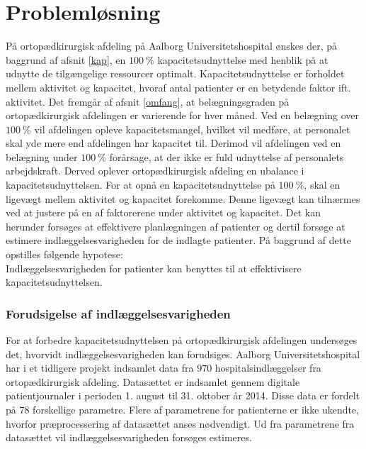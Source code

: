 \chapter{Problemløsning}
På ortopædkirurgisk afdeling på Aalborg Universitetshospital ønskes der, på baggrund af afsnit \ref{kap}, en $100~\%$ kapacitetsudnyttelse med henblik på at udnytte de tilgængelige ressourcer optimalt. Kapacitetsudnyttelse er forholdet mellem aktivitet og kapacitet, hvoraf antal patienter er en betydende faktor ift. aktivitet. 
Det fremgår af afsnit \ref{omfang}, at belægningsgraden på ortopædkirurgisk afdelingen er varierende for hver måned. Ved en belægning over $100~\%$ vil afdelingen opleve kapacitetsmangel, hvilket vil medføre, at personalet skal yde mere end afdelingen har kapacitet til. Derimod vil afdelingen ved en belægning under $100~\%$ forårsage, at der ikke er fuld udnyttelse af personalets arbejdskraft. Derved oplever ortopædkirurgisk afdeling en ubalance i kapacitetsudnyttelsen. 
For at opnå en kapacitetsudnyttelse på $100~\%$, skal en ligevægt mellem aktivitet og kapacitet forekomme. Denne ligevægt kan tilnærmes ved at justere på en af faktorerene under aktivitet og kapacitet\cite{Bames2015}. Det kan herunder forsøges at effektivere planlægningen af patienter og dertil forsøge at estimere indlæggelsesvarigheden for de indlagte patienter. 
På baggrund af dette opstilles følgende hypotese:\\

\noindent
Indlæggelsesvarigheden for patienter kan benyttes til at effektivisere kapacitetsudnyttelsen. 

\subsection{Forudsigelse af indlæggelsesvarigheden}
For at forbedre kapacitetsudnyttelsen på ortopædkirurgisk afdelingen undersøges det, hvorvidt indlæggelsesvarigheden kan forudsiges.
Aalborg Universitetshospital har i et tidligere projekt indsamlet data fra $970$ hospitalsindlæggelser fra ortopædkirurgisk afdeling. Datasættet er indsamlet gennem digitale patientjournaler i perioden 1. august til 31. oktober år 2014. Disse data er fordelt på 78 forskellige parametre. Flere af parametrene for patienterne er ikke ukendte, hvorfor præprocessering af datasættet anses nødvendigt. Ud fra parametrene fra datasættet vil indlæggelsesvarigheden forsøges estimeres. 


